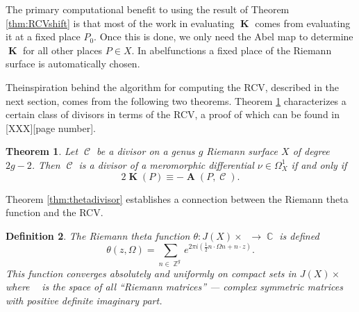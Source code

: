 \documentclass[12pt]{article}
\newtheorem{theorem}{Theorem}
\newtheorem{definition}[theorem]{Definition}
\theoremstyle{definition}
\DeclareMathOperator{\ZZ}{\mathbb{Z}}
\DeclareMathOperator{\CC}{\mathbb{C}}
\DeclareMathOperator{\hg}{\mathfrak{h}_g}
\DeclareMathOperator{\DivC}{\mathcal{C}}
\DeclareMathOperator{\RCV}{\boldsymbol{K}}
\DeclareMathOperator{\Abel}{\boldsymbol{A}}
\begin{document}
The primary computational benefit to using the result of Theorem
\ref{thm:RCVshift} is that most of the work in evaluating $\RCV$ comes
from evaluating it at a fixed place $P_0$. Once this is done, we only
need the Abel map to determine $\RCV$ for all other places $P \in X$. In
{\sc abelfunctions} a fixed place of the Riemann surface is
automatically chosen.

Theinspiration behind the algorithm for computing the RCV, described in
the next section, comes from the following two theorems. Theorem
\ref{thm:rcvequiv} characterizes a certain class of divisors in terms of
the RCV, a proof of which can be found in \cite{FarkasKra92}[XXX][page
  number].
\begin{theorem} \label{thm:rcvequiv}
  Let $\DivC$ be a divisor on a genus $g$ Riemann surface $X$ of degree
  $2g - 2$. Then $\DivC$ is a divisor of a meromorphic differential $\nu
  \in \Omega_X^1$ if and only if
  \begin{equation} \label{eqn:rcvequiv}
    2\RCV(P) \equiv -\Abel(P,\DivC).
  \end{equation}
\end{theorem}
Theorem \ref{thm:thetadivisor} establishes a connection between the
Riemann theta function and the RCV.
\begin{definition} \label{def:riemanntheta}
  The Riemann theta function $\theta: J(X) \times \hg \to \CC$ is
  defined
  \begin{equation} \label{eqn:riemanntheta}
    \theta(z,\Omega)
    =
    \sum_{n \in \ZZ^g}
    e^{2 \pi i \left( \tfrac{1}{2} n \cdot \Omega n + n \cdot z \right)}.
  \end{equation}
  This function converges absolutely and uniformly on compact sets in
  $J(X) \times \hg$ where $\hg$ is the space of all {\it ``Riemann
    matrices''} --- complex symmetric matrices with positive definite
  imaginary part.
\end{definition}
\end{document}
